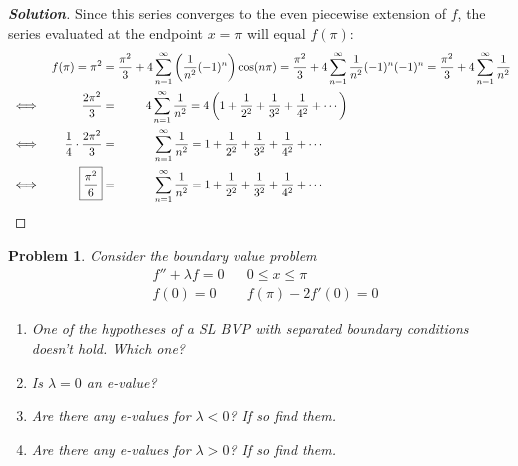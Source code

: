 \documentclass[a4paper,12pt]{article} %
\theoremstyle{plain}
\newtheorem{problem}{Problem}
\begin{document}
\begin{proof}[\textbf{Solution}]
    Since this series converges to the even piecewise extension of $f$, the series evaluated at the endpoint $x=\pi$ will equal $f(\pi)$:
    \begin{align*}
    &&f(\pi) = \pi^2 &= \frac{\pi^2}{3} + 4\sum_{n=1}^\infty \left(\frac{1}{n^2 }(-1)^n\right)\cos(n\pi) = \frac{\pi^2}{3} + 4\sum_{n=1}^\infty \frac{1}{n^2 }(-1)^n(-1)^n = \frac{\pi^2}{3} + 4\sum_{n=1}^\infty \frac{1}{n^2 } \\
    &\iff& \frac{2\pi^2}{3} & = \hphantom{\frac{\pi^2}{3} +\ } 4\sum_{n=1}^\infty \frac{1}{n^2 } = 4\left(1 + \frac{1}{2^2} + \frac{1}{3^2} + \frac{1}{4^2} + \cdots\right) \\
    &\iff& \frac{1}{4} \cdot \frac{2\pi^2}{3} &= \hphantom{\frac{\pi^2}{3} + 4} \sum_{n=1}^\infty \frac{1}{n^2 } = 1 + \frac{1}{2^2} + \frac{1}{3^2} + \frac{1}{4^2} + \cdots\\
    &\iff& \boxed{\frac{\pi^2}{6}} &= \hphantom{\frac{\pi^2}{3} + 4} \sum_{n=1}^\infty \frac{1}{n^2 } = 1 + \frac{1}{2^2} + \frac{1}{3^2} + \frac{1}{4^2} + \cdots
    \end{align*}
    
\end{proof}

\begin{problem} %
    Consider the boundary value problem
    \begin{align*}
        &f'' + \lambda f = 0 &  &0 \leq x \leq \pi \\
        &f(0) = 0 && f(\pi) -2f'(0) = 0
    \end{align*}
    
    \begin{enumerate}[label=\alph*.)]
        \item One of the hypotheses of a SL BVP with separated boundary conditions doesn't hold. Which one?
        \item Is $\lambda =0$ an e-value?
        \item Are there any e-values for $\lambda < 0$? If so find them.
        \item Are there any e-values for $\lambda > 0$? If so find them.
    \end{enumerate}
\end{problem}
\end{document}
